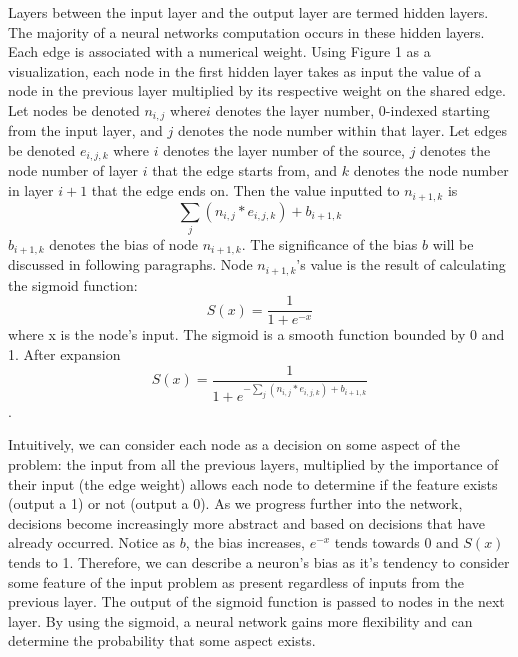 \documentclass{article}
\newenvironment{Figure}
  {\par\medskip\noindent\minipage{\linewidth}}
  {\endminipage\par\medskip}
\begin{document}
\begin{multicols}{2}
\begin{Figure}
\end{Figure}
	Layers between the input layer and the output layer are termed hidden layers. The majority of a neural networks computation occurs in these hidden layers. Each edge is associated with a numerical weight. Using Figure 1 as a visualization, each node in the first hidden layer takes as input the value of a node in the previous layer multiplied by its respective weight on the shared edge. Let nodes be denoted \(n_{i,j}\) where\( i\) denotes the layer number, 0-indexed starting from the input layer, and \(j\) denotes the node number within that layer. Let edges be denoted \(e_{i,j,k}\) where \(i\) denotes the layer number of the source, \(j\) denotes the node number of layer \(i\) that the edge starts from, and \(k\) denotes the node number in layer \(i+1\) that the edge ends on. Then the value inputted to \(n_{i+1,k}\) is \[\sum_{j}(n_{i,j}*e_{i,j,k}) + b_{i+1,k}\]
\(b_{i+1,k}\) denotes the bias of node \(n_{i+1,k}\). The significance of the bias \(b\) will be discussed in following paragraphs. Node \(n_{i+1,k}\)'s value is the result of calculating the sigmoid function: \[ S(x) = \frac{1}{1+e^{-x}} \] where x is the node's input. The sigmoid is a smooth function bounded by 0 and 1. After expansion \[S(x) = \frac{1}{1+e^{-\sum_{j}(n_{i,j}*e_{i,j,k}) + b_{i+1,k}}}\]. 
\par
	Intuitively, we can consider each node as a decision on some aspect of the problem: the input from all the previous layers, multiplied by the importance of their input (the edge weight) allows each node to determine if the feature exists (output a 1) or not (output a 0). As we progress further into the network, decisions become increasingly more abstract and based on decisions that have already occurred. Notice as \(b\), the bias increases, \(e^{-x}\) tends towards 0 and \(S(x)\) tends to 1. Therefore, we can describe a neuron’s bias as it’s tendency to consider some feature of the input problem as present regardless of inputs from the previous layer. The output of the sigmoid function is passed to nodes in the next layer. By using the sigmoid, a neural network gains more flexibility and can determine the probability that some aspect exists.
\par

\end{multicols}
\end{document}
